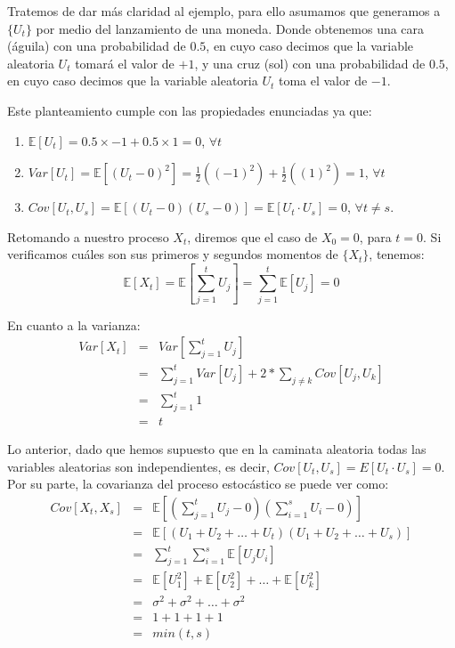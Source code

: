 \documentclass[
]{book}
\begin{document}
Tratemos de dar más claridad al ejemplo, para ello asumamos que generamos a \(\{U_t\}\) por medio del lanzamiento de una moneda. Donde obtenemos una cara (águila) con una probabilidad de \(0.5\), en cuyo caso decimos que la variable aleatoria \(U_t\) tomará el valor de \(+1\), y una cruz (sol) con una probabilidad de \(0.5\), en cuyo caso decimos que la variable aleatoria \(U_t\) toma el valor de \(-1\).

Este planteamiento cumple con las propiedades enunciadas ya que:

\begin{enumerate}
\def\labelenumi{\arabic{enumi}.}
\item
  \(\mathbb{E}[U_t] = 0.5 \times -1 + 0.5 \times 1 = 0\), \(\forall t\)
\item
  \(Var[U_t] = \mathbb{E}[(U_t - 0)^2] = \frac{1}{2}((-1)^2) + \frac{1}{2}((1)^2) = 1\), \(\forall t\)
\item
  \(Cov[U_t,U_s] = \mathbb{E}[(U_t - 0)(U_s - 0)] = \mathbb{E}[U_t \cdot U_s] = 0\), \(\forall t \neq s\).
\end{enumerate}

Retomando a nuestro proceso \(X_t\), diremos que el caso de \(X_0 = 0\), para \(t = 0\). Si verificamos cuáles son sus primeros y segundos momentos de \(\{X_t\}\), tenemos:
\begin{equation}
    \mathbb{E}[X_t] = \mathbb{E}\left[ \sum^t_{j=1} U_j \right] = \sum^t_{j=1} \mathbb{E}[U_j] = 0
    \label{eq:em3}
\end{equation}

En cuanto a la varianza:
\begin{eqnarray}
    Var[X_t] & = & Var \left[ \sum^t_{j=1} U_j \right] \nonumber \\
    & = & \sum^t_{j=1} Var[U_j] + 2 * \sum_{j \neq k} Cov[U_j,U_k] \nonumber \\
    & = & \sum^t_{j=1} 1 \nonumber \\
    & = & t
    \label{eq:em4}
\end{eqnarray}

Lo anterior, dado que hemos supuesto que en la caminata aleatoria todas las variables aleatorias son independientes, es decir, \(Cov[U_t,U_s] = E[U_t \cdot U_s] = 0\). Por su parte, la covarianza del proceso estocástico se puede ver como:
\begin{eqnarray*}
    Cov[X_t,X_s] & = & \mathbb{E} \left[ \left( \sum^t_{j=1} U_j - 0 \right) \left( \sum^s_{i=1} U_i - 0 \right) \right] \\
    & = & \mathbb{E}[(U_1 + U_2 + \ldots + U_t)(U_1 + U_2 + \ldots + U_s)] \\
    & = & \sum^t_{j=1} \sum^s_{i=1} \mathbb{E}[U_j U_i] \\
    & = & \mathbb{E}[U^2_1] + \mathbb{E}[U^2_2] + \ldots + \mathbb{E}[U^2_k] \\
    & = & \sigma^2 + \sigma^2 + \ldots + \sigma^2 \\
    & = & 1 + 1 + 1 + 1 \\
    & = & min(t,s)
\end{eqnarray*}
\end{document}
